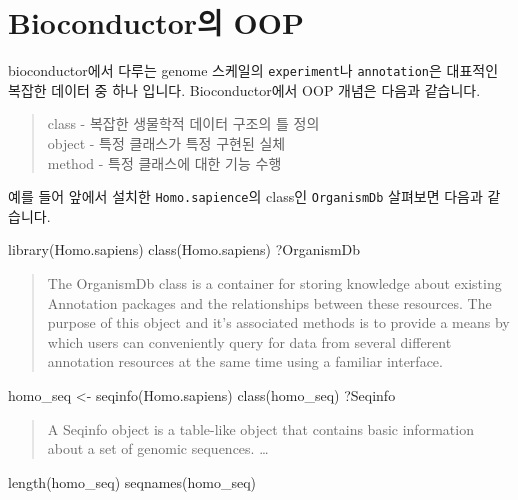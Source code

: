 \documentclass[
  a4paper,
]{book}
\newenvironment{Shaded}{\begin{snugshade}}{\end{snugshade}}
\newcommand{\FunctionTok}[1]{\textcolor[rgb]{0.28,0.35,0.67}{#1}}
\newcommand{\NormalTok}[1]{\textcolor[rgb]{0.00,0.23,0.31}{#1}}
\newcommand{\OtherTok}[1]{\textcolor[rgb]{0.00,0.23,0.31}{#1}}
\begin{document}
\hypertarget{bioconductoruxc758-oop}{%
\section{Bioconductor의 OOP}\label{bioconductoruxc758-oop}}

bioconductor에서 다루는 genome 스케일의 \texttt{experiment}나
\texttt{annotation}은 대표적인 복잡한 데이터 중 하나 입니다.
Bioconductor에서 OOP 개념은 다음과 같습니다.

\begin{quote}
class - 복잡한 생물학적 데이터 구조의 틀 정의\\
object - 특정 클래스가 특정 구현된 실체\\
method - 특정 클래스에 대한 기능 수행
\end{quote}

예를 들어 앞에서 설치한 \texttt{Homo.sapience}의 class인
\texttt{OrganismDb} 살펴보면 다음과 같습니다.

\begin{Shaded}
\begin{Highlighting}[]
\FunctionTok{library}\NormalTok{(Homo.sapiens)}
\FunctionTok{class}\NormalTok{(Homo.sapiens)}
\NormalTok{?OrganismDb}
\end{Highlighting}
\end{Shaded}

\begin{quote}
The OrganismDb class is a container for storing knowledge about existing
Annotation packages and the relationships between these resources. The
purpose of this object and it's associated methods is to provide a means
by which users can conveniently query for data from several different
annotation resources at the same time using a familiar interface.
\end{quote}

\begin{Shaded}
\begin{Highlighting}[]
\NormalTok{homo\_seq }\OtherTok{\textless{}{-}} \FunctionTok{seqinfo}\NormalTok{(Homo.sapiens)}
\FunctionTok{class}\NormalTok{(homo\_seq)}
\NormalTok{?Seqinfo}
\end{Highlighting}
\end{Shaded}

\begin{quote}
A Seqinfo object is a table-like object that contains basic information
about a set of genomic sequences. \ldots{}
\end{quote}

\begin{Shaded}
\begin{Highlighting}[]
\FunctionTok{length}\NormalTok{(homo\_seq)}
\FunctionTok{seqnames}\NormalTok{(homo\_seq)}
\end{Highlighting}
\end{Shaded}
\end{document}
